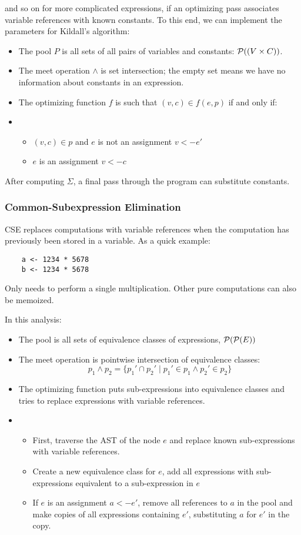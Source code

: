 \documentclass{article}
\begin{document}
and so on for more complicated expressions, if an optimizing pass associates variable references with known constants.
To this end, we can implement the parameters for Kildall's algorithm:
\begin{itemize}
\item The pool $P$ is all sets of all pairs of variables and constants: $\mathcal{P}((V \times C))$.
\item The meet operation $\wedge$ is set intersection; the empty set means we have no information about constants in an expression.
\item The optimizing function $f$ is such that $(v, c) \in f(e, p)$ if and only if:
\item[]
  \begin{itemize}
  \item $(v, c) \in p$ and $e$ is not an assignment $v <- e'$
  \item $e$ is an assignment $v <- c$
  \end{itemize}
\end{itemize}
After computing $\Sigma$, a final pass through the program can substitute constants.

\subsubsection*{Common-Subexpression Elimination}
CSE replaces computations with variable references when the computation has previously been stored in a variable.
As a quick example:
\begin{lstlisting}
    a <- 1234 * 5678
    b <- 1234 * 5678
\end{lstlisting}

Only needs to perform a single multiplication.
Other pure computations can also be memoized.

In this analysis:
\begin{itemize}
\item The pool is all sets of equivalence classes of expressions, $\mathcal{P}(\mathcal{P}(E))$
\item The meet operation is pointwise intersection of equivalence classes:
  $$p_1 \wedge p_2 = \{ p_1' \cap p_2' \mid p_1' \in p_1 \wedge p_2' \in p_2 \}$$
\item The optimizing function puts sub-expressions into equivalence classes and tries to replace expressions with variable references.
\item[]
  \begin{itemize}
  \item First, traverse the AST of the node $e$ and replace known sub-expressions with variable references.
  \item Create a new equivalence class for $e$, add all expressions with sub-expressions equivalent to a sub-expression in $e$
  \item If $e$ is an assignment $a <- e'$, remove all references to $a$ in the pool and make copies of all expressions containing $e'$, substituting $a$ for $e'$ in the copy.
  \end{itemize}
\end{itemize}
\end{document}
